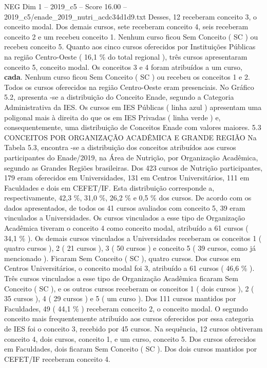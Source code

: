\begin{textsample}{NEG Dim 1 – 2019\_c5 – Score 16.00 – 2019\_c5/enade\_2019\_nutri\_acdc34d1d9.txt}
Desses, 12 receberam conceito 3, o conceito modal.
Dos demais cursos, sete receberam conceito 4, seis receberam conceito 2 e um recebeu conceito 1.
Nenhum curso ficou Sem Conceito ( SC ) ou recebeu conceito 5.
Quanto aos cinco cursos oferecidos por Instituições Públicas na região Centro-Oeste ( 16,1 \% do total regional ), três cursos apresentaram conceito 5, conceito modal.
Os conceitos 3 e 4 foram atribuídos a um curso, \textbf{cada}.
Nenhum curso ficou Sem Conceito ( SC ) ou recebeu os conceitos 1 e 2.
Todos os cursos oferecidos na região Centro-Oeste eram presenciais.
No Gráfico 5.2, apresenta -se a distribuição do Conceito Enade, segundo a Categoria Administrativa da IES.
Os cursos em IES Públicas ( linha azul ) apresentam uma poligonal mais à direita do que os em IES Privadas ( linha verde ) e, consequentemente, uma distribuição de Conceitos Enade com valores maiores. 5.3 CONCEITOS POR ORGANIZAÇÃO ACADÊMICA E GRANDE REGIÃO Na Tabela 5.3, encontra -se a distribuição dos conceitos atribuídos aos cursos participantes do Enade/2019, na Área de Nutrição, por Organização Acadêmica, segundo as Grandes Regiões brasileiras.
Dos 423 cursos de Nutrição participantes, 179 eram oferecidos em Universidades, 131 em Centros Universitários, 111 em Faculdades e dois em CEFET/IF.
Esta distribuição corresponde a, respectivamente, 42,3 \%, 31,0 \%, 26,2 \% e 0,5 \% dos cursos.
De acordo com os dados apresentados, de todos os 41 cursos avaliados com conceito 5, 39 eram vinculados a Universidades.
Os cursos vinculados a esse tipo de Organização Acadêmica tiveram o conceito 4 como conceito modal, atribuído a 61 cursos ( 34,1 \% ).
Os demais cursos vinculados a Universidades receberam os conceitos 1 ( quatro cursos ), 2 ( 21 cursos ), 3 ( 50 cursos ) e conceito 5 ( 39 cursos, como já mencionado ).
Ficaram Sem Conceito ( SC ), quatro cursos.
Dos cursos em Centros Universitários, o conceito modal foi 3, atribuído a 61 cursos ( 46,6 \% ).
Três cursos vinculados a esse tipo de Organização Acadêmica ficaram Sem Conceito ( SC ), e os outros cursos receberam os conceitos 1 ( dois cursos ), 2 ( 35 cursos ), 4 ( 29 cursos ) e 5 ( um curso ).
Dos 111 cursos mantidos por Faculdades, 49 ( 44,1 \% ) receberam conceito 2, o conceito modal.
O segundo conceito mais frequentemente atribuído aos cursos oferecidos por essa categoria de IES foi o conceito 3, recebido por 45 cursos.
Na sequência, 12 cursos obtiveram conceito 4, dois cursos, conceito 1, e um curso, conceito 5.
Dos cursos oferecidos em Faculdades, dois ficaram Sem Conceito ( SC ).
Dos dois cursos mantidos por CEFET/IF receberam conceito 4.

\end{textsample}
